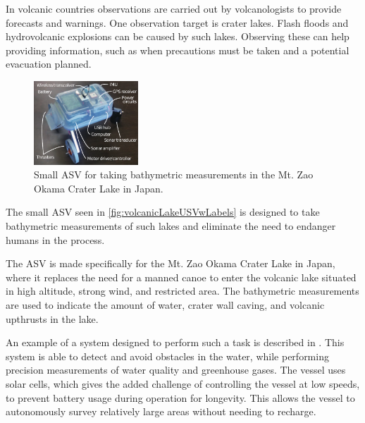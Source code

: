 In volcanic countries observations are carried out by volcanologists to provide forecasts and warnings. One observation target is crater lakes. Flash floods and hydrovolcanic explosions can be caused by such lakes. Observing these can help providing information, such as when precautions must be taken and a potential evacuation planned. \cite{AWatanabe}
%
\begin{figure}[H]
  \includegraphics[width=0.35\textwidth]{figures/volcanicLakeUSVwLabels.pdf}
  \caption{Small ASV for taking bathymetric measurements in the Mt. Zao Okama Crater Lake in Japan. \cite{AWatanabe}}
  \label{fig:volcanicLakeUSVwLabels}
\end{figure}
\vspace{-6mm}
%
The small ASV seen in \autoref{fig:volcanicLakeUSVwLabels} is designed to take bathymetric measurements of such lakes and eliminate the need to endanger humans in the process. \cite{AWatanabe}

The ASV is made specifically for the Mt. Zao Okama Crater Lake in Japan, where it replaces the need for a manned canoe to enter the volcanic lake situated in high altitude, strong wind, and restricted area. The bathymetric measurements are used to indicate the amount of water, crater wall caving, and volcanic upthrusts in the lake. \cite{AWatanabe}

An example of a system designed to perform such a task is described in \cite{asv_solar}.
This system is able to detect and avoid obstacles in the water, while performing precision measurements of water quality and greenhouse gases. 
The vessel uses solar cells, which gives the added challenge of controlling the vessel at low speeds, to prevent battery usage during operation for longevity. 
This allows the vessel to autonomously survey relatively large areas without needing to recharge. 

